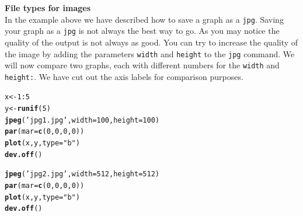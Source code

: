 \documentclass{article}\usepackage[]{graphicx}\usepackage[]{color}
\makeatletter
\newcommand{\hlnum}[1]{\textcolor[rgb]{0.686,0.059,0.569}{#1}}%
\newcommand{\hlstr}[1]{\textcolor[rgb]{0.192,0.494,0.8}{#1}}%
\newcommand{\hlopt}[1]{\textcolor[rgb]{0,0,0}{#1}}%
\newcommand{\hlstd}[1]{\textcolor[rgb]{0.345,0.345,0.345}{#1}}%
\newcommand{\hlkwb}[1]{\textcolor[rgb]{0.69,0.353,0.396}{#1}}%
\newcommand{\hlkwc}[1]{\textcolor[rgb]{0.333,0.667,0.333}{#1}}%
\newcommand{\hlkwd}[1]{\textcolor[rgb]{0.737,0.353,0.396}{\textbf{#1}}}%
\newenvironment{kframe}{%
 \def\at@end@of@kframe{}%
 \ifinner\ifhmode%
  \def\at@end@of@kframe{\end{minipage}}%
  \begin{minipage}{\columnwidth}%
 \fi\fi%
 \def\FrameCommand##1{\hskip\@totalleftmargin \hskip-\fboxsep
 \colorbox{shadecolor}{##1}\hskip-\fboxsep
     \hskip-\linewidth \hskip-\@totalleftmargin \hskip\columnwidth}%
 \MakeFramed {\advance\hsize-\width
   \@totalleftmargin\z@ \linewidth\hsize
   \@setminipage}}%
 {\par\unskip\endMakeFramed%
 \at@end@of@kframe}
\newenvironment{knitrout}{}{} %
\makeatother
\begin{document}
\begin{mdframed}
\textbf{File types for images}\\
In the example above we have described how to save a graph as a \texttt{jpg}. Saving your graph as a \texttt{jpg} is not always the best way to go. As you may notice the quality of the output is not always as good. You can try to increase the quality of the image by adding the parameters \texttt{width} and \texttt{height} to the \texttt{jpg} command. We will now compare two graphs, each with different numbers for the \texttt{width} and \texttt{height:}. We have cut out the axis labels for comparison purposes.

\begin{knitrout}
\color{fgcolor}\begin{kframe}
\begin{alltt}
\hlstd{x}\hlkwb{<-}\hlnum{1}\hlopt{:}\hlnum{5}
\hlstd{y}\hlkwb{<-}\hlkwd{runif}\hlstd{(}\hlnum{5}\hlstd{)}
\hlkwd{jpeg}\hlstd{(}\hlstr{'jpg1.jpg'}\hlstd{,}\hlkwc{width}\hlstd{=}\hlnum{100}\hlstd{,}\hlkwc{height}\hlstd{=}\hlnum{100}\hlstd{)}
\hlkwd{par}\hlstd{(}\hlkwc{mar}\hlstd{=}\hlkwd{c}\hlstd{(}\hlnum{0}\hlstd{,}\hlnum{0}\hlstd{,}\hlnum{0}\hlstd{,}\hlnum{0}\hlstd{))}
\hlkwd{plot}\hlstd{(x,y,}\hlkwc{type}\hlstd{=}\hlstr{"b"}\hlstd{)}
\hlkwd{dev.off}\hlstd{()}

\hlkwd{jpeg}\hlstd{(}\hlstr{'jpg2.jpg'}\hlstd{,}\hlkwc{width}\hlstd{=}\hlnum{512}\hlstd{,}\hlkwc{height}\hlstd{=}\hlnum{512}\hlstd{)}
\hlkwd{par}\hlstd{(}\hlkwc{mar}\hlstd{=}\hlkwd{c}\hlstd{(}\hlnum{0}\hlstd{,}\hlnum{0}\hlstd{,}\hlnum{0}\hlstd{,}\hlnum{0}\hlstd{))}
\hlkwd{plot}\hlstd{(x,y,}\hlkwc{type}\hlstd{=}\hlstr{"b"}\hlstd{)}
\hlkwd{dev.off}\hlstd{()}
\end{alltt}
\end{kframe}
\end{knitrout}


\end{mdframed}
\end{document}
